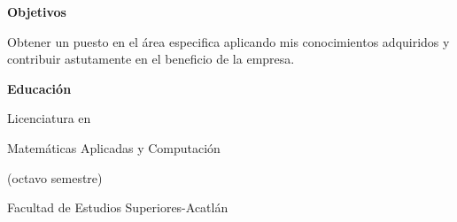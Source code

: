 \documentclass[10pt]{article}
\begin{document}
\begin{minipage}[t]{0.45\textwidth}
	\vspace{-\baselineskip} %

\begin{large}
\textbf{Objetivos}
\end{large}


Obtener un puesto en el área  especifica  aplicando mis conocimientos adquiridos y contribuir astutamente en el beneficio de la empresa.

\end{minipage}
\hfill %
\begin{minipage}[t]{0.5\textwidth}
\begin{flushright}
	\vspace{-\baselineskip} %

\begin{large}
\textbf{Educación}
\end{large}


Licenciatura en 

Matemáticas Aplicadas y Computación

(octavo semestre)

Facultad de Estudios Superiores-Acatlán

\end{flushright}
\end{minipage}
\end{document}

